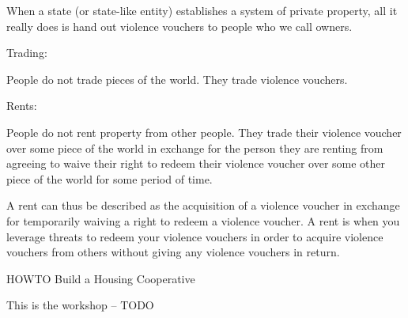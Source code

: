 \documentclass{article}
\begin{document}
When a state (or state-like entity) establishes a system of private property, all it really does is hand out violence vouchers to people who we call owners. 

\large Trading:

People do not trade pieces of the world. They trade violence vouchers. 

\large Rents:

People do not rent property from other people. They trade their violence voucher over some piece of the world in exchange for the person they are renting from agreeing to waive their right to redeem their violence voucher over some other piece of the world for some period of time.

A rent can thus be described as the acquisition of a violence voucher in exchange for temporarily waiving a right to redeem a violence voucher. A rent is when you leverage threats to redeem your violence vouchers in order to acquire violence vouchers from others without giving any violence vouchers in return.


\pagebreak
\huge HOWTO Build a Housing Cooperative

This is the workshop -- TODO

\vspace{1cm}
\end{document}
